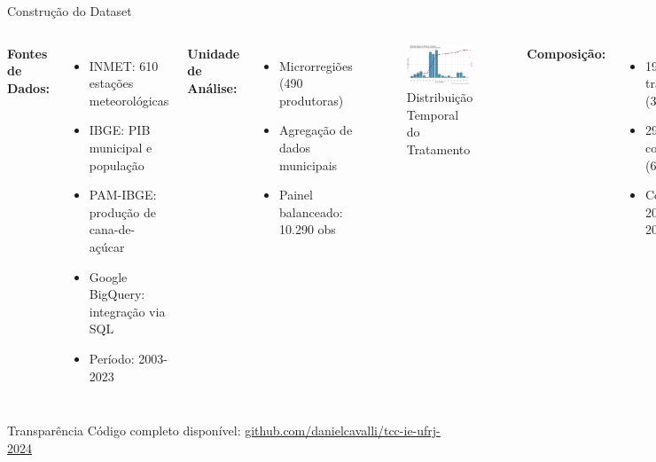 \documentclass[10pt,aspectratio=169]{beamer}
\begin{document}
\begin{frame}{Construção do Dataset}
\begin{columns}
\textbf{Fontes de Dados:}
\begin{itemize}
    \item INMET: 610 estações meteorológicas
    \item IBGE: PIB municipal e população
    \item PAM-IBGE: produção de cana-de-açúcar
    \item Google BigQuery: integração via SQL
    \item Período: 2003-2023
\end{itemize}

\textbf{Unidade de Análise:}
\begin{itemize}
    \item Microrregiões (490 produtoras)
    \item Agregação de dados municipais
    \item Painel balanceado: 10.290 obs
\end{itemize}

\begin{figure}
\centering
\includegraphics[width=\textwidth]{../../../data/outputs/descriptive_analysis/distribuicao_temporal_tratamento.png}
\caption{Distribuição Temporal do Tratamento}
\end{figure}

\textbf{Composição:}
\begin{itemize}
    \item 191 tratadas (39\%)
    \item 299 controle (61\%)
    \item Coortes: 2005-2019
\end{itemize}
\end{columns}

\begin{block}{Transparência}
Código completo disponível: \url{github.com/danielcavalli/tcc-ie-ufrj-2024}
\end{block}
\end{frame}
\end{document}
